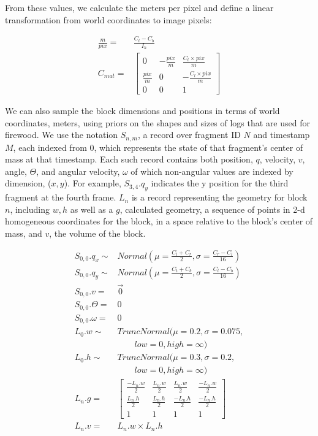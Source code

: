 \documentclass[runningheads]{llncs}
\begin{document}
From these values, we calculate the meters per pixel and define a linear 
transformation from world coordinates to image pixels:

\begin{align*}
    \frac{m}{pix} =& \frac{C_t - C_b}{I_h} \\
          C_{mat} =& \begin{bmatrix}
                        0 & -\frac{pix}{m} &  \frac{C_t \times pix}{m} \\
            \frac{pix}{m} &              0 & -\frac{C_l \times pix}{m} \\
                        0 &              0 &                         1
        \end{bmatrix}
\end{align*}

We can also sample the block dimensions and positions in terms of world 
coordinates, meters, using priors on the shapes and sizes of logs that are used 
for firewood. We use the notation 
$S_{n,m}$, a record over fragment ID $N$ 
and timestamp $M$, each indexed from 0, which represents the state of that 
fragment's center of mass at that timestamp. Each such record contains both position, 
$q$, velocity, $v$, angle, $\Theta$, and angular velocity, $\omega$ of which 
non-angular values are indexed by dimension, ($x, y$). For 
example, $S_{3,4}.q_y$ indicates the y position for 
the third fragment at the fourth frame. $L_n$ is a record representing the geometry for 
block $n$, including $w, h$ as well as a $g$, calculated geometry, a 
sequence of points in 2-d homogeneous coordinates for the block, in a space 
relative to the block's center of mass, and $v$, the volume of the block.

\begin{align*}
       S_{0,0}.q_x \sim& Normal(\mu=\frac{C_l + C_r}{2},\sigma=\frac{C_r - C_l}{16}) \\
       S_{0,0}.q_y \sim& Normal(\mu=\frac{C_t + C_b}{2},\sigma=\frac{C_t - C_b}{16}) \\
          S_{0,0}.v =& \overrightarrow{0} \\
     S_{0,0}.\Theta =& 0 \\
     S_{0,0}.\omega =& 0 \\
             L_0.w \sim& TruncNormal(\mu=0.2,\sigma=0.075, \\ 
                       & \qquad low=0,high=\infty) \\
             L_0.h \sim& TruncNormal(\mu=0.3,\sigma=0.2, \\ 
                       & \qquad low=0,high=\infty) \\
              L_n.g =& \begin{bmatrix}
                  \frac{-L_n.w}{2} & \frac{L_n.w}{2} &  \frac{L_n.w}{2} & \frac{-L_n.w}{2} \\
                   \frac{L_n.h}{2} & \frac{L_n.h}{2} & \frac{-L_n.h}{2} & \frac{-L_n.h}{2} \\
                                 1 &               1 &                1 &                1
              \end{bmatrix} \\
              L_n.v =& L_n.w \times L_n.h
\end{align*}
\end{document}
